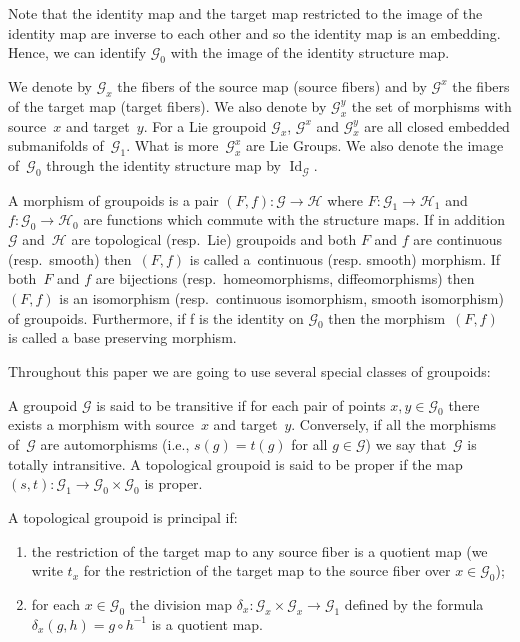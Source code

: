 \documentclass[11pt]{article}
\begin{document}
\begin{rem} Note that the identity map and the target map restricted to the image of the identity map are inverse to each other and so the identity map is an embedding. Hence, we can identify $\mathcal{G}_0$ with the image of the identity structure map.
\end{rem}
We denote by $\mathcal{G}_x$ the fibers of the source map (source fibers) and by $\mathcal{G}^x$ the fibers of the target map (target fibers). We also denote by $\mathcal{G}^y_x$ the set of morphisms with source~$x$ and target~$y$. For a Lie groupoid $\mathcal{G}_x$, $\mathcal{G}^x$ and $\mathcal{G}^y_x$ are all closed embedded submanifolds of~$\mathcal{G}_1$. What is more~$\mathcal{G}^x_x$ are Lie Groups. We also denote the image of~$\mathcal{G}_0$ through the identity structure map by $\operatorname{Id}_{\mathcal{G}}$.
\begin{defi} A morphism of groupoids is a pair $(F,f)\colon \mathcal{G}\rightarrow\mathcal{H}$ where $F\colon \mathcal{G}_1\rightarrow\mathcal{H}_1$ and $f\colon \mathcal{G}_0\rightarrow\mathcal{H}_0$ are functions which commute with the structure maps. If in addition~$\mathcal{G}$ and~$\mathcal{H}$ are topological (resp.\ Lie) groupoids and both $F$ and $f$ are continuous (resp.\ smooth) then~$(F,f)$ is called a~continuous (resp. smooth) morphism. If both~$F$ and $f$ are bijections (resp.\ homeo\-morphisms, diffeomorphisms) then $(F,f)$ is an isomorphism (resp.\ continuous isomorphism, smooth isomorphism) of groupoids. Furthermore, if f is the identity on $\mathcal{G}_0$ then the morphism~$(F,f)$ is called a base preserving morphism.
\end{defi}
Throughout this paper we are going to use several special classes of groupoids:
\begin{defi} A groupoid $\mathcal{G}$ is said to be transitive if for each pair of points $x,y\in\mathcal{G}_0$ there exists a morphism with source~$x$ and target~$y$. Conversely, if all the morphisms of~$\mathcal{G}$ are automorphisms (i.e., $s(g) = t(g)$ for all $g\in \mathcal{G}$) we say that~$\mathcal{G}$ is totally intransitive. A topological groupoid is said to be proper if the map $(s,t)\colon \mathcal{G}_1\rightarrow\mathcal{G}_0\times\mathcal{G}_0$ is proper.
\end{defi}
\begin{defi} A topological groupoid is principal if:
\begin{enumerate}\itemsep=0pt
\item[1)] the restriction of the target map to any source fiber is a quotient map (we write $t_x$ for the restriction of the target map to the source fiber over $x\in\mathcal{G}_0$);
\item[2)] for each $x\in\mathcal{G}_0$ the division map $\delta_x\colon \mathcal{G}_x\times\mathcal{G}_x\rightarrow\mathcal{G}_1$ defined by the formula $\delta_x(g,h)=g\circ h^{-1}$ is a quotient map.
\end{enumerate}
\end{defi}
\end{document}
